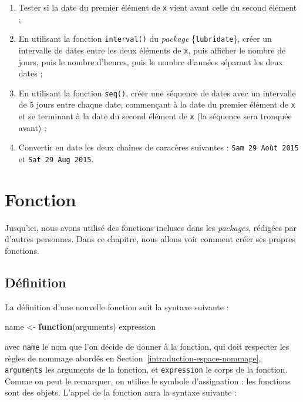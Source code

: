 \documentclass[
  11pt,
]{book}
\makeatletter
\newenvironment{Shaded}{\begin{snugshade}}{\end{snugshade}}
\newcommand{\ControlFlowTok}[1]{\textcolor[rgb]{0.13,0.29,0.53}{\textbf{#1}}}
\newcommand{\NormalTok}[1]{#1}
\newcommand{\StringTok}[1]{\textcolor[rgb]{0.31,0.60,0.02}{#1}}
\providecommand{\tightlist}{%
  \setlength{\itemsep}{0pt}\setlength{\parskip}{0pt}}
\numberwithin{equation}{section}
\numberwithin{countremarque}{section}
\newenvironment{exframe}{%
 \def\at@end@of@exframe{}%
 \ifinner\ifhmode%
  \def\at@end@of@exframe{\end{minipage}}%
  \begin{minipage}{\columnwidth}%
 \fi\fi%
 \def\FrameCommand##1{\hskip\@totalleftmargin \hskip-\fboxsep
 \colorbox{shadecolorex}{##1}\hskip-\fboxsep
     \hskip-\linewidth \hskip-\@totalleftmargin \hskip\columnwidth}%
 \MakeFramed {\advance\hsize-\width
   \@totalleftmargin\z@ \linewidth\hsize
   \@setminipage}}%
 {\par\unskip\endMakeFramed%
 \at@end@of@exframe}
\makeatother
\begin{document}
\begin{exframe}
\begin{enumerate}
\def\labelenumi{\arabic{enumi}.}
\setcounter{enumi}{10}
\tightlist
\item
  Tester si la date du premier élément de \texttt{x} vient avant celle du second élément ;
\item
  En utilisant la fonction \texttt{interval()} du \emph{package} \{\texttt{lubridate}\}, créer un intervalle de dates entre les deux éléments de \texttt{x}, puis afficher le nombre de jours, puis le nombre d'heures, puis le nombre d'années séparant les deux dates ;
\item
  En utilisant la fonction \texttt{seq()}, créer une séquence de dates avec un intervalle de 5 jours entre chaque date, commençant à la date du premier élément de \texttt{x} et se terminant à la date du second élément de \texttt{x} (la séquence sera tronquée avant) ;
\item
  Convertir en date les deux chaînes de caracères suivantes : \texttt{Sam\ 29\ Aoùt\ 2015} et \texttt{Sat\ 29\ Aug\ 2015}.
\end{enumerate}
\end{exframe}

\hypertarget{fonction}{%
\chapter{Fonction}\label{fonction}}

Jusqu'ici, nous avons utilisé des fonctions incluses dans les \emph{packages}, rédigées par d'autres personnes. Dans ce chapitre, nous allons voir comment créer ses propres fonctions.

\hypertarget{duxe9finition}{%
\section{Définition}\label{duxe9finition}}

La définition d'une nouvelle fonction suit la syntaxe suivante :

\begin{Shaded}
\begin{Highlighting}[]
\NormalTok{name \textless{}{-}}\StringTok{ }\ControlFlowTok{function}\NormalTok{(arguments) expression}
\end{Highlighting}
\end{Shaded}

avec \texttt{name} le nom que l'on décide de donner à la fonction, qui doit respecter les règles de nommage abordés en Section~\ref{introduction-espace-nommage}, \texttt{arguments} les arguments de la fonction, et \texttt{expression} le corps de la fonction. Comme on peut le remarquer, on utilise le symbole d'assignation : les fonctions sont des objets. L'appel de la fonction aura la syntaxe suivante :
\end{document}
